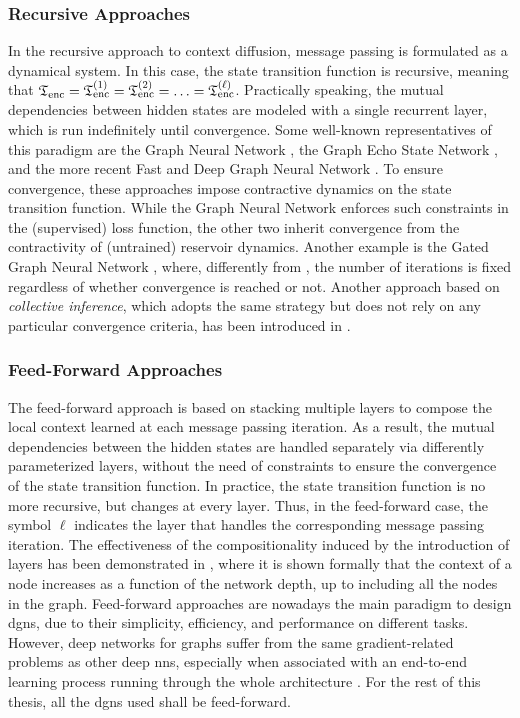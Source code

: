 \subsubsection*{Recursive Approaches}
In the recursive approach to context diffusion, message passing is formulated as a dynamical system. In this case, the state transition function is recursive, meaning that $\mathfrak{T}_{\mathrm{enc}} = \mathfrak{T}_{\mathrm{enc}}^{(1)} = \mathfrak{T}_{\mathrm{enc}}^{(2)} = \ldots = \mathfrak{T}_{\mathrm{enc}}^{(\ell)}$. Practically speaking, the mutual dependencies between hidden states are modeled with a single recurrent layer, which is run indefinitely until convergence. Some well-known representatives of this paradigm are the Graph Neural Network \citep{scarselli2009gnn}, the Graph Echo State Network \citep{gallicchio2010graphesn}, and the more recent Fast and Deep Graph Neural Network \citep{gallicchio2020fastdeepgnn}. To ensure convergence, these approaches impose contractive dynamics on the state transition function. While the Graph Neural Network enforces such constraints in the (supervised) loss function, the other two inherit convergence from the contractivity of (untrained) reservoir dynamics. Another example is the Gated Graph Neural Network \citep{li2016gatedgnn}, where, differently from \citet{scarselli2009gnn}, the number of iterations is fixed \apriori regardless of whether convergence is reached or not. Another approach based on \emph{collective inference}, which adopts the same strategy but does not rely on any particular convergence criteria, has been introduced in \citep{macskassy2007classificationnetworkdata}.

\subsubsection*{Feed-Forward Approaches}
The feed-forward approach is based on stacking multiple layers to compose the local context learned at each message passing iteration. As a result, the mutual dependencies between the hidden states are handled separately via differently parameterized layers, without the need of constraints to ensure the convergence of the state transition function. In practice, the state transition function is no more recursive, but changes at every layer. Thus, in the feed-forward case, the symbol $\ell$ indicates the layer that handles the corresponding message passing iteration. The effectiveness of the compositionality induced by the introduction of layers has been demonstrated in \citep{micheli2009nn4g}, where it is shown formally that the context of a node increases as a function of the network depth, up to including all the nodes in the graph. Feed-forward approaches are nowadays the main paradigm to design \glspl{dgn}, due to their simplicity, efficiency, and performance on different tasks. However, deep networks for graphs suffer from the same gradient-related problems as other deep \glspl{nn}, especially when associated with an end-to-end learning process running through the whole architecture \citep{bengio1994learninglongtermdependenciesdifficult,li2018deeperinsightgraphconvsemisupervised}. For the rest of this thesis, all the \glspl{dgn} used shall be feed-forward.

